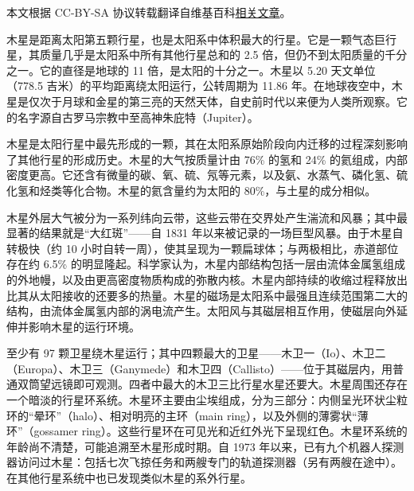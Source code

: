 
本文根据 CC-BY-SA 协议转载翻译自维基百科\href{https://en.wikipedia.org/wiki/Jupiter}{相关文章}。


木星是距离太阳第五颗行星，也是太阳系中体积最大的行星。它是一颗气态巨行星，其质量几乎是太阳系中所有其他行星总和的 2.5 倍，但仍不到太阳质量的千分之一。它的直径是地球的 11 倍，是太阳的十分之一。木星以 5.20 天文单位（778.5 吉米）的平均距离绕太阳运行，公转周期为 11.86 年。在地球夜空中，木星是仅次于月球和金星的第三亮的天然天体，自史前时代以来便为人类所观察。它的名字源自古罗马宗教中至高神朱庇特（Jupiter）。

木星是太阳行星中最先形成的一颗，其在太阳系原始阶段向内迁移的过程深刻影响了其他行星的形成历史。木星的大气按质量计由 76\% 的氢和 24\% 的氦组成，内部密度更高。它还含有微量的碳、氧、硫、氖等元素，以及氨、水蒸气、磷化氢、硫化氢和烃类等化合物。木星的氦含量约为太阳的 80\%，与土星的成分相似。

木星外层大气被分为一系列纬向云带，这些云带在交界处产生湍流和风暴；其中最显著的结果就是“大红斑”——自 1831 年以来被记录的一场巨型风暴。由于木星自转极快（约 10 小时自转一周），使其呈现为一颗扁球体；与两极相比，赤道部位存在约 6.5\% 的明显隆起。科学家认为，木星内部结构包括一层由流体金属氢组成的外地幔，以及由更高密度物质构成的弥散内核。木星内部持续的收缩过程释放出比其从太阳接收的还要多的热量。木星的磁场是太阳系中最强且连续范围第二大的结构，由流体金属氢内部的涡电流产生。太阳风与其磁层相互作用，使磁层向外延伸并影响木星的运行环境。

至少有 97 颗卫星绕木星运行；其中四颗最大的卫星——木卫一（Io）、木卫二（Europa）、木卫三（Ganymede）和木卫四（Callisto）——位于其磁层内，用普通双筒望远镜即可观测。四者中最大的木卫三比行星水星还要大。木星周围还存在一个暗淡的行星环系统。木星环主要由尘埃组成，分为三部分：内侧呈光环状尘粒环的“晕环”（halo）、相对明亮的主环（main ring），以及外侧的薄雾状“薄环”（gossamer ring）。这些行星环在可见光和近红外光下呈现红色。木星环系统的年龄尚不清楚，可能追溯至木星形成时期。自 1973 年以来，已有九个机器人探测器访问过木星：包括七次飞掠任务和两艘专门的轨道探测器（另有两艘在途中）。在其他行星系统中也已发现类似木星的系外行星。
